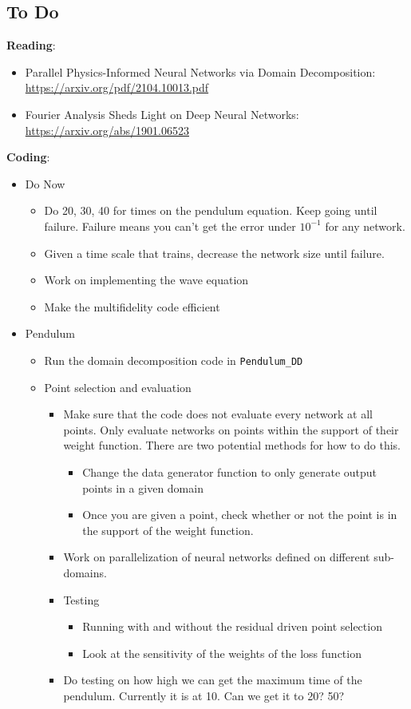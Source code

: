 \documentclass{article}
\def\bf{\textbf}
\begin{document}
\subsection*{To Do}
\bf{Reading}:
\begin{itemize}
	\item Parallel Physics-Informed Neural Networks via Domain Decomposition: \url{https://arxiv.org/pdf/2104.10013.pdf}
	\item Fourier Analysis Sheds Light on Deep Neural Networks: \url{https://arxiv.org/abs/1901.06523}
\end{itemize}
\bf{Coding}:
\begin{itemize}
	\item Do Now
	\begin{itemize}
		\item Do 20, 30, 40 for times on the pendulum equation. Keep going until failure. Failure means you can't get the error under $10^{-1}$ for any network.
		\item Given a time scale that trains, decrease the network size until failure.
		\item Work on implementing the wave equation
		\item Make the multifidelity code efficient
	\end{itemize}
	\item Pendulum
	\begin{itemize}
		\item Run the domain decomposition code in \verb|Pendulum_DD|
		\item Point selection and evaluation
		\begin{itemize}
			\item Make sure that the code does not evaluate every network at all points. Only evaluate networks on points within the support of their weight function. There are two potential methods for how to do this.
			\begin{itemize}
				\item Change the data generator function to only generate output points in a given domain 
				\item Once you are given a point, check whether or not the point is in the support of the weight function.
			\end{itemize}
			\item Work on parallelization of neural networks defined on different sub-domains.
			\item Testing
			\begin{itemize}
				\item Running with and without the residual driven point selection
				\item Look at the sensitivity of the weights of the loss function
			\end{itemize}
			\item Do testing on how high we can get the maximum time of the pendulum. Currently it is at 10. Can we get it to 20? 50?
		\end{itemize}
	\end{itemize}



\end{itemize}
\end{document}

